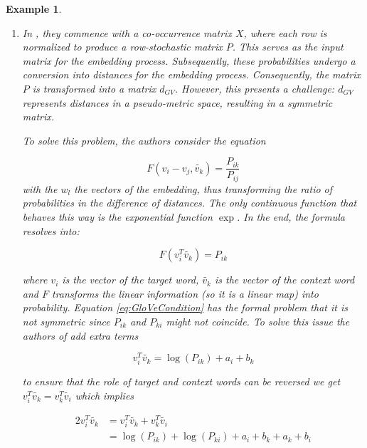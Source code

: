 \documentclass[10pt,a4paper]{elsarticle}
\newtheorem{exa}[theorem]{Example}
\begin{document}
\begin{exa}\label{exa:gv-w2v}
	\begin{enumerate}
		\item In \cite{pennington2014glove}, they commence with a co-occurrence matrix $X$, where each row is normalized to produce a row-stochastic matrix $P$. This serves as the input matrix for the embedding process. Subsequently, these probabilities undergo a conversion into distances for the embedding process. Consequently, the matrix $P$ is transformed into a matrix $d_{GV}$. However, this presents a challenge: $d_{GV}$ represents distances in a pseudo-metric space, resulting in a symmetric matrix.
		
		To solve this problem, the authors consider the equation
		
		\begin{equation}
			F(v_i-v_j,\tilde{v_k})=\frac{P_{ik}}{P_{ij}}
		\end{equation}
		with the $w_l$ the vectors of the embedding, thus transforming the ratio of probabilities in the difference of distances. The only continuous function that behaves this way is the exponential function $\exp$. In the end, the formula resolves into:
		
		\begin{equation}\label{eq:GloVeCondition}
			F(v_i^{T}\tilde{v_k})=P_{ik}
		\end{equation}
		
		where $v_i$ is the vector of the target word, $\tilde{v_k}$ is the vector of the context word and $F$ transforms the linear information (so it is a linear map) into probability. Equation \eqref{eq:GloVeCondition} has the formal problem that it is not symmetric since $P_{ik}$ and $P_{ki}$ might not coincide. To solve this issue the authors of \cite{pennington2014glove} add extra terms
		
		
		\begin{equation}\label{eq:GloVeConditionbias}
			v_i^{T}\tilde{v_k}=\log(P_{ik}) + a_{i}+ b_{k}
		\end{equation}
		
		to ensure that the role of target and context words can be reversed we get $v_i^{T}\tilde{v_k}=v_k^{T}\tilde{v_i}$ which implies
		
		
		\begin{align}
			2 v_i^{T}\tilde{v_k}&=v_i^{T}\tilde{v_k} + v_k^{T}\tilde{v_i}\\
			&= \log(P_{ik})+\log(P_{ki}) + a_{i}+ b_{k} + a_{k}+ b_{i}
		\end{align}
		

\end{enumerate}
\end{exa}
\end{document}
